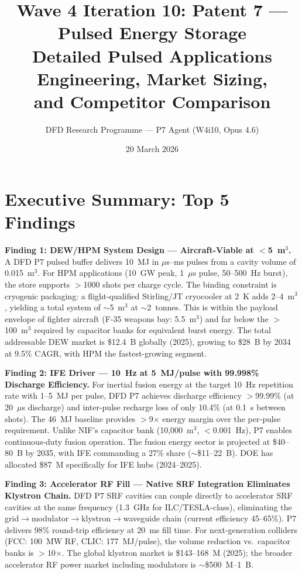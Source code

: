 \documentclass[11pt]{article}
\title{Wave 4 Iteration 10: Patent 7 --- Pulsed Energy Storage\\
\large Detailed Pulsed Applications Engineering, Market Sizing,\\
and Competitor Comparison}
\author{DFD Research Programme --- P7 Agent (W4i10, Opus 4.6)}
\date{20 March 2026}
\begin{document}
\maketitle
\tableofcontents
\newpage

\section*{Executive Summary: Top 5 Findings}

\begin{tcolorbox}[colback=blue!5!white, colframe=blue!60!black,
  title=\textbf{W4i10 P7 --- Top 5 Findings}]

\textbf{Finding 1: DEW/HPM System Design --- Aircraft-Viable at $<$5~m$^3$.}
A DFD P7 pulsed buffer delivers 10~MJ in $\mu$s--ms pulses from a cavity
volume of 0.015~m$^3$. For HPM applications (10~GW peak, 1~$\mu$s pulse,
50--500~Hz burst), the store supports $>$1000 shots per charge cycle. The
binding constraint is cryogenic packaging: a flight-qualified Stirling/JT
cryocooler at 2~K adds 2--4~m$^3$, yielding a total system of $\sim$5~m$^3$
at $\sim$2~tonnes. This is within the payload envelope of fighter aircraft
(F-35 weapons bay: 5.5~m$^3$) and far below the $>$100~m$^3$ required by
capacitor banks for equivalent burst energy. The total addressable DEW
market is \$12.4~B globally (2025), growing to \$28~B by 2034 at 9.5\%
CAGR, with HPM the fastest-growing segment.

\textbf{Finding 2: IFE Driver --- 10~Hz at 5~MJ/pulse with 99.998\% Discharge Efficiency.}
For inertial fusion energy at the target 10~Hz repetition rate with
1--5~MJ per pulse, DFD P7 achieves discharge efficiency $>$99.99\% (at
20~$\mu$s discharge) and inter-pulse recharge loss of only 10.4\% (at
0.1~s between shots). The 46~MJ baseline provides $>$9$\times$ energy
margin over the per-pulse requirement. Unlike NIF's capacitor bank
(10,000~m$^3$, $<$0.001~Hz), P7 enables continuous-duty fusion operation.
The fusion energy sector is projected at \$40--80~B by 2035, with IFE
commanding a 27\% share ($\sim$\$11--22~B). DOE has allocated \$87~M
specifically for IFE hubs (2024--2025).

\textbf{Finding 3: Accelerator RF Fill --- Native SRF Integration Eliminates Klystron Chain.}
DFD P7 SRF cavities can couple directly to accelerator SRF cavities at
the same frequency (1.3~GHz for ILC/TESLA-class), eliminating the
grid$\to$modulator$\to$klystron$\to$waveguide chain (current efficiency
45--65\%). P7 delivers 98\% round-trip efficiency at 20~ms fill time.
For next-generation colliders (FCC: 100~MW RF, CLIC: 177~MJ/pulse),
the volume reduction vs.\ capacitor banks is $>$10$\times$. The global
klystron market is \$143--168~M (2025); the broader accelerator RF
power market including modulators is $\sim$\$500~M--1~B.


\end{tcolorbox}
\end{document}
